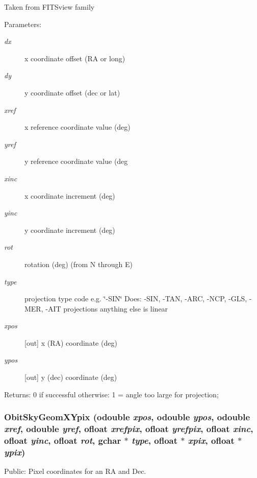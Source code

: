 Taken from FITSview family \begin{Desc}
\item[Parameters:]
\begin{description}
\item[{\em dx}]x coordinate offset (RA or long) \item[{\em dy}]y coordinate offset (dec or lat) \item[{\em xref}]x reference coordinate value (deg) \item[{\em yref}]y reference coordinate value (deg \item[{\em xinc}]x coordinate increment (deg) \item[{\em yinc}]y coordinate increment (deg) \item[{\em rot}]rotation (deg) (from N through E) \item[{\em type}]projection type code e.g. \char`\"{}-SIN\char`\"{} Does: -SIN, -TAN, -ARC, -NCP, -GLS, -MER, -AIT projections anything else is linear \item[{\em xpos}][out] x (RA) coordinate (deg) \item[{\em ypos}][out] y (dec) coordinate (deg) \end{description}
\end{Desc}
\begin{Desc}
\item[Returns:]0 if successful otherwise: 1 = angle too large for projection; \end{Desc}
\subsubsection{ Obit\-Sky\-Geom\-XYpix ({\bf odouble} {\em xpos}, {\bf odouble} {\em ypos}, {\bf odouble} {\em xref}, {\bf odouble} {\em yref}, {\bf ofloat} {\em xrefpix}, {\bf ofloat} {\em yrefpix}, {\bf ofloat} {\em xinc}, {\bf ofloat} {\em yinc}, {\bf ofloat} {\em rot}, gchar $\ast$ {\em type}, {\bf ofloat} $\ast$ {\em xpix}, {\bf ofloat} $\ast$ {\em ypix})}\label{ObitSkyGeom_8c_a11}


Public: Pixel coordinates for an RA and Dec. 

